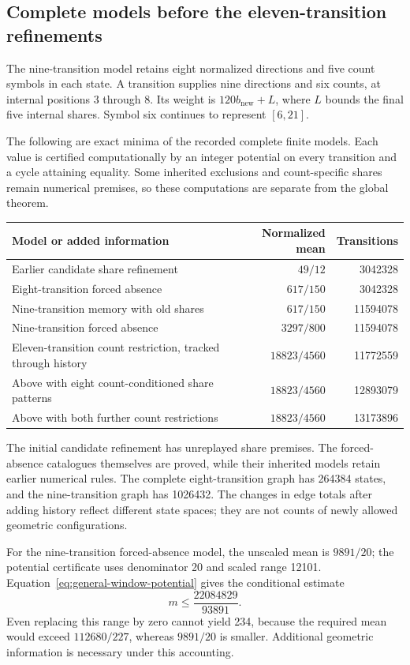 \documentclass[11pt,a4paper]{article}
\theoremstyle{definition}
\theoremstyle{remark}
\begin{document}
\subsection{Complete models before the eleven-transition refinements}
The nine-transition model retains eight normalized directions and five count symbols in each state. A transition supplies nine directions and six counts, at internal positions 3 through 8. Its weight is $120b_{\mathrm{new}}+L$, where $L$ bounds the final five internal shares. Symbol six continues to represent $[6,21]$.

The following are exact minima of the recorded complete finite models. Each value is certified computationally by an integer potential on every transition and a cycle attaining equality. Some inherited exclusions and count-specific shares remain numerical premises, so these computations are separate from the global theorem.
\begin{center}\small
\begin{tabular}{p{}r r}
\toprule
Model or added information & Normalized mean & Transitions\\\midrule
Earlier candidate share refinement & $49/12$ & 3042328\\
Eight-transition forced absence & $617/150$ & 3042328\\
Nine-transition memory with old shares & $617/150$ & 11594078\\
Nine-transition forced absence & $3297/800$ & 11594078\\
Eleven-transition count restriction, tracked through history & $18823/4560$ & 11772559\\
Above with eight count-conditioned share patterns & $18823/4560$ & 12893079\\
Above with both further count restrictions & $18823/4560$ & 13173896\\
\bottomrule
\end{tabular}
\end{center}
The initial candidate refinement has unreplayed share premises. The forced-absence catalogues themselves are proved, while their inherited models retain earlier numerical rules. The complete eight-transition graph has 264384 states, and the nine-transition graph has 1026432. The changes in edge totals after adding history reflect different state spaces; they are not counts of newly allowed geometric configurations.

For the nine-transition forced-absence model, the unscaled mean is $9891/20$; the potential certificate uses denominator 20 and scaled range 12101. Equation~\eqref{eq:general-window-potential} gives the conditional estimate
\[
m\le\frac{22084829}{93891}.
\]
Even replacing this range by zero cannot yield 234, because the required mean would exceed $112680/227$, whereas $9891/20$ is smaller. Additional geometric information is necessary under this accounting.
\end{document}
